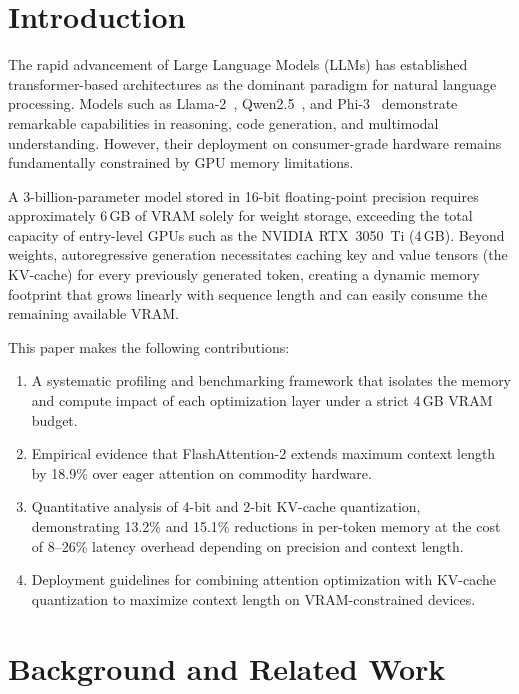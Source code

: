 \documentclass[conference]{IEEEtran}
\begin{document}
\section{Introduction}
\label{sec:intro}

The rapid advancement of Large Language Models (LLMs) has established transformer-based architectures as the dominant paradigm for natural language processing. Models such as Llama-2~\cite{touvron2023llama}, Qwen2.5~\cite{qwen2023}, and Phi-3~\cite{abdin2024phi} demonstrate remarkable capabilities in reasoning, code generation, and multimodal understanding. However, their deployment on consumer-grade hardware remains fundamentally constrained by GPU memory limitations.

A 3-billion-parameter model stored in 16-bit floating-point precision requires approximately 6\,GB of VRAM solely for weight storage, exceeding the total capacity of entry-level GPUs such as the NVIDIA RTX~3050~Ti (4\,GB). Beyond weights, autoregressive generation necessitates caching key and value tensors (the KV-cache) for every previously generated token, creating a dynamic memory footprint that grows linearly with sequence length and can easily consume the remaining available VRAM.

This paper makes the following contributions:
\begin{enumerate}
    \item A systematic profiling and benchmarking framework that isolates the memory and compute impact of each optimization layer under a strict 4\,GB VRAM budget.
    \item Empirical evidence that FlashAttention-2 extends maximum context length by 18.9\% over eager attention on commodity hardware.
    \item Quantitative analysis of 4-bit and 2-bit KV-cache quantization, demonstrating 13.2\% and 15.1\% reductions in per-token memory at the cost of 8--26\% latency overhead depending on precision and context length.
    \item Deployment guidelines for combining attention optimization with KV-cache quantization to maximize context length on VRAM-constrained devices.
\end{enumerate}

\section{Background and Related Work}
\label{sec:background}
\end{document}
